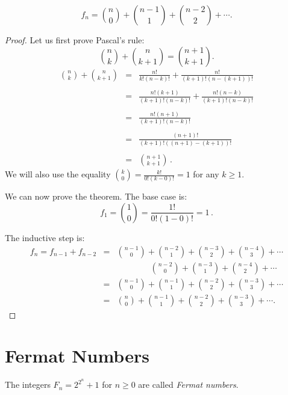 
\begin{theorem}
\[
f_n = \binom{n}{0} + \binom{n-1}{1} + \binom{n-2}{2} + \cdots.
\]
\end{theorem}

\begin{proof}
Let us first prove Pascal's rule:
\[
\binom{n}{k} + \binom{n}{k+1} = \binom{n+1}{k+1}.
\]
\begin{eqnarray*}
\binom{n}{k} + \binom{n}{k+1} &=& \frac{n!}{k!(n-k)!} + \frac{n!}{(k+1)!(n-(k+1))!}\\
\\
&=&\frac{n!(k+1)}{(k+1)!(n-k)!}+\frac{n!(n-k)}{(k+1)!(n-k)!}\\\\
&=&\frac{n!(n+1)}{(k+1)!(n-k)!}\\\\
&=&\frac{(n+1)!}{(k+1)!((n+1)-(k+1))!}\\\\
&=&\binom{n+1}{k+1}\,.
\end{eqnarray*}
We will also use the equality $\displaystyle\binom{k}{0} = \frac{k!}{0!(k-0)!} = 1$ for any $k\geq 1$.

\medskip

We can now prove the theorem. The base case is:
\[
f_1 =  \binom{1}{0} = \frac{1!}{0!(1-0)!}=1\,.
\]

\newpage

The inductive step is:
\begin{eqnarray*}
f_n=f_{n-1} + f_{n-2} &=& \binom{n-1}{0} + \binom{n-2}{1} + \binom{n-3}{2} + \binom{n-4}{3} + \cdots\\
&&\quad\quad\quad\quad\binom{n-2}{0} + \binom{n-3}{1} + \binom{n-4}{2} + \cdots\\
&=&\binom{n-1}{0} + \binom{n-1}{1} + \binom{n-2}{2} + \binom{n-3}{3} + \cdots\\
&=&\binom{n}{0} + \binom{n-1}{1} + \binom{n-2}{2} + \binom{n-3}{3} + \cdots.
\end{eqnarray*}

\end{proof}



\section{Fermat Numbers}\label{s.induction-fermat}
\begin{definition}
The integers $F_n=2^{2^{n}}+1$ for $n\geq 0$ are called \emph{Fermat numbers}.
\end{definition}

